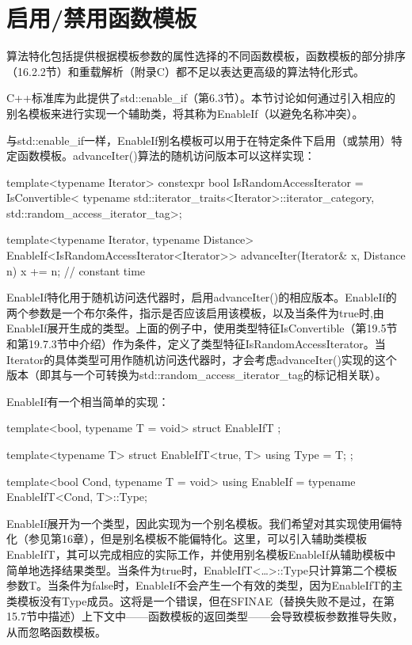 \section{启用/禁用函数模板}

算法特化包括提供根据模板参数的属性选择的不同函数模板，函数模板的部分排序（16.2.2节）和重载解析（附录C）都不足以表达更高级的算法特化形式。

C++标准库为此提供了std::enable\_if（第6.3节）。本节讨论如何通过引入相应的别名模板来进行实现一个辅助类，将其称为EnableIf（以避免名称冲突）。

与std::enable\_if一样，EnableIf别名模板可以用于在特定条件下启用（或禁用）特定函数模板。advanceIter()算法的随机访问版本可以这样实现：

\begin{cpp}
template<typename Iterator>
constexpr bool IsRandomAccessIterator =
	IsConvertible<
		typename std::iterator_traits<Iterator>::iterator_category,
		std::random_access_iterator_tag>;
		
template<typename Iterator, typename Distance>
EnableIf<IsRandomAccessIterator<Iterator>>
advanceIter(Iterator& x, Distance n) {
	x += n; // constant time
}
\end{cpp}

EnableIf特化用于随机访问迭代器时，启用advanceIter()的相应版本。EnableIf的两个参数是一个布尔条件，指示是否应该启用该模板，以及当条件为true时,由EnableIf展开生成的类型。上面的例子中，使用类型特征IsConvertible（第19.5节和第19.7.3节中介绍）作为条件，定义了类型特征IsRandomAccessIterator。当Iterator的具体类型可用作随机访问迭代器时，才会考虑advanceIter()实现的这个版本（即其与一个可转换为std::random\_access\_iterator\_tag的标记相关联）。

EnableIf有一个相当简单的实现：

\begin{cpp}
template<bool, typename T = void>
struct EnableIfT {
};

template<typename T>
struct EnableIfT<true, T> {
	using Type = T;
};

template<bool Cond, typename T = void>
using EnableIf = typename EnableIfT<Cond, T>::Type;
\end{cpp}

EnableIf展开为一个类型，因此实现为一个别名模板。我们希望对其实现使用偏特化（参见第16章），但是别名模板不能偏特化。这里，可以引入辅助类模板EnableIfT，其可以完成相应的实际工作，并使用别名模板EnableIf从辅助模板中简单地选择结果类型。当条件为true时，EnableIfT<…>::Type只计算第二个模板参数T。当条件为false时，EnableIf不会产生一个有效的类型，因为EnableIfT的主类模板没有Type成员。这将是一个错误，但在SFINAE（替换失败不是过，在第15.7节中描述）上下文中——函数模板的返回类型——会导致模板参数推导失败，从而忽略函数模板。

